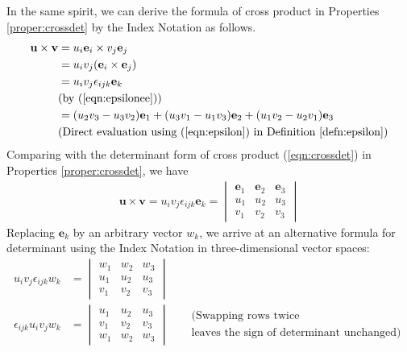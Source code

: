 In the same spirit, we can derive the formula of cross product in Properties \ref{proper:crossdet} by the Index Notation as follows.
\begin{align}
\textbf{u} \times \textbf{v} &= u_i\textbf{e}_i \times v_j\textbf{e}_j \nonumber \\
&= u_iv_j (\textbf{e}_i \times \textbf{e}_j) \nonumber \\
&= u_iv_j \epsilon_{ijk} \textbf{e}_k \label{eqn:crossind} \\
& \text{(by (\ref{eqn:epsilonee}))} \nonumber \\
&= (u_2v_3 - u_3v_2)\textbf{e}_1 + (u_3v_1 - u_1v_3)\textbf{e}_2 + (u_1v_2 - u_2v_1)\textbf{e}_3 \nonumber \\
& \text{(Direct evaluation using (\ref{eqn:epsilon}) in Definition \ref{defn:epsilon})} \nonumber
\end{align}
Comparing with the determinant form of cross product (\ref{eqn:crossdet}) in Properties \ref{proper:crossdet}, we have
\begin{align}
\textbf{u} \times \textbf{v} = u_iv_j \epsilon_{ijk} \textbf{e}_k = 
\begin{vmatrix}
\textbf{e}_1 & \textbf{e}_2 & \textbf{e}_3 \\
u_1 & u_2 & u_3 \\
v_1 & v_2 & v_3
\end{vmatrix}
\label{eqn:crosstens}
\end{align}
Replacing $\textbf{e}_k$ by an arbitrary vector $w_k$, we arrive at an alternative formula for determinant using the Index Notation in three-dimensional vector spaces:
\begin{align}
u_iv_j \epsilon_{ijk} w_k &= 
\begin{vmatrix}
w_1 & w_2 & w_3 \\
u_1 & u_2 & u_3 \\
v_1 & v_2 & v_3
\end{vmatrix}  \nonumber \\
\epsilon_{ijk}  u_iv_jw_k &= 
\begin{vmatrix}
u_1 & u_2 & u_3 \\
v_1 & v_2 & v_3 \\
w_1 & w_2 & w_3
\end{vmatrix} & \begin{aligned}
&\text{(Swapping rows twice} \\ 
&\text{leaves the sign of determinant unchanged)}     
\end{aligned} \label{eqn:determinanteps1} 
\end{align}
